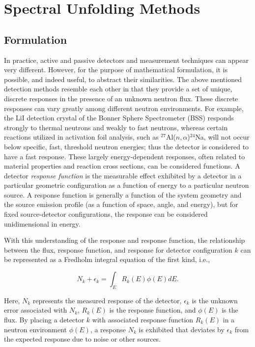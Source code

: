 \section{Spectral Unfolding Methods}


\subsection{Formulation}


In practice, active and passive detectors and measurement techniques can appear very different.
However, for the purpose of mathematical formulation, it is possible, and indeed useful, to abstract their similarities.
The above mentioned detection methods resemble each other in that they provide a set of unique, discrete responses in the presence of an unknown neutron flux.
These discrete responses can vary greatly among different neutron environments.
For example, the LiI detection crystal of the Bonner Sphere Spectrometer (BSS) responds strongly to thermal neutrons and weakly to fast neutrons, whereas certain reactions utilized in activation foil analysis, such as $^{27}$Al($n, \alpha$)$^{24}$Na, will not occur below specific, fast, threshold neutron energies; thus the detector is considered to have a fast response.
These largely energy-dependent responses, often related to material properties and reaction cross sections, can be considered functions.
A detector {\it response function} is the measurable effect exhibited by a detector in a particular geometric configuration as a function of energy to a particular neutron source.
A response function is generally a function of the system geometry and the source emission profile (as a function of space, angle, and energy), but for fixed source-detector configurations, the response can be considered unidimensional in energy.

With this understanding of the response and response function, the relationship between the flux, response function, and response for detector configuration $k$ can be represented as a Fredholm integral equation of the first kind, i.e.,

\begin{equation}
\label{eqn:cont-response}
N_k + \epsilon_k = \int_E R_k(E) \phi(E) dE .
\end{equation}

\noindent
Here, $N_k$ represents the measured response of the detector, $\epsilon_k$ is the unknown error associated with $N_k$, $R_k(E)$ is the response function, and $\phi(E)$ is the flux.
By placing a detector $k$ with associated response function $R_k(E)$ in a neutron environment $\phi(E)$, a response $N_k$ is exhibited that deviates by $\epsilon_k$ from the expected response due to noise or other sources.


